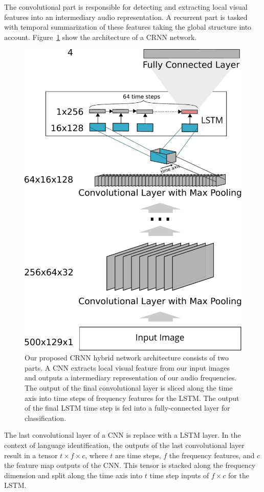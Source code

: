 The convolutional part is responsible for detecting and extracting local visual features into an intermediary audio representation. A recurrent part is tasked with temporal summarization of these features taking the global structure into account. Figure~\ref{fig:crnn} show the architecture of a CRNN network. 
%
	\begin{figure}[]
  		\centering
    	\includegraphics[]{img/crnn.pdf}
    	\caption{Our proposed CRNN hybrid network architecture consists of two parts. A CNN extracts local visual feature from our input images and outputs a intermediary representation of our audio frequencies. The output of the final convolutional layer is sliced along the time axis into time steps of frequency features for the LSTM. The output of the final LSTM time step is fed into a fully-connected layer for classification.}
    	\label{fig:crnn}
	\end{figure}
	The last convolutional layer of a CNN is replace with a LSTM layer. In the context of language identification, the outputs of the last convolutional layer result in a tensor $t \times f \times c$, where $t$ are time steps, $f$ the frequency features, and $c$ the feature map outputs of the CNN. This tensor is stacked along the frequency dimension and split along the time axis into $t$ time step inputs of $ f \times c$ for the LSTM.
	
